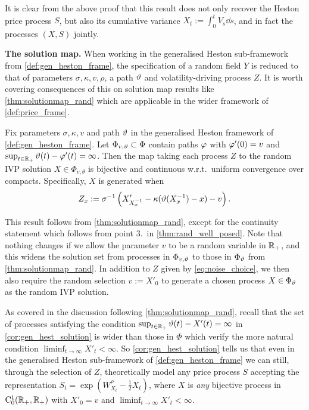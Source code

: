 It is clear from the above proof that this result does not only recover the Heston price process $S$, but also its cumulative variance $X_t:=\int_0^t V_s\dd s$, and in fact the processes $(X,S)$ jointly.

\vspace{3mm}\textbf{The solution map.} When working in the generalised Heston sub-framework from \autoref{def:gen_heston_frame}, the specification of a random field $Y$ is reduced to that of parameters $\sigma,\kappa,v,\rho$, a path $\vartheta$ and volatility-driving process $Z$. It is worth covering consequences of this on solution map results like \autoref{thm:solutionmap_rand} which are applicable in the wider framework of \autoref{def:price_frame}.

\begin{corollary}\label{cor:gen_hest_solution}
    Fix parameters $\sigma,\kappa,v$ and path $\vartheta$ in the generalised Heston framework of \autoref{def:gen_heston_frame}. Let $\Phi_{v,\vartheta}\subset\Phi$ contain paths $\varphi$ with $\varphi'(0)=v$ and $\sup_{t\in\mathbb{R}_+}\vartheta(t)-\varphi'(t)=\infty$. Then the map taking each process $Z$ to the random IVP solution $X\in\Phi_{v,\theta}$ is bijective and continuous w.r.t.~uniform convergence over compacts. Specifically, $X$ is generated when
    \begin{equation}\label{eq:noise_choice}
        Z_x := \sigma^{-1}\left( X'_{X^{-1}_x}-\kappa(\vartheta(X^{-1}_x) - x) - v \right).
    \end{equation}
\end{corollary}

This result follows from \autoref{thm:solutionmap_rand}, except for the continuity statement which follows from point 3.~in \autoref{thm:rand_well_posed}. Note that nothing changes if we allow the parameter $v$ to be a random variable in $\mathbb{R}_+$, and this widens the solution set from processes in $\Phi_{v,\vartheta}$ to those in $\Phi_{\vartheta}$ from \autoref{thm:solutionmap_rand}. In addition to $Z$ given by \autoref{eq:noise_choice}, we then also require the random selection $v:=X'_0$ to generate a chosen process $X\in\Phi_\vartheta$ as the random IVP solution.

As covered in the discussion following \autoref{thm:solutionmap_rand}, recall that the set of processes satisfying the condition $\sup_{t\in\mathbb{R}_+}\vartheta(t)-X'(t)=\infty$ in \autoref{cor:gen_hest_solution} is wider than those in $\Phi$ which verify the more natural condition $\liminf_{t\to\infty}X'_t<\infty$. So \autoref{cor:gen_hest_solution} tells us that even in the generalised Heston sub-framework of \autoref{def:gen_heston_frame} we can still, through the selection of $Z$, theoretically model any price process $S$ accepting the representation $S_t=\exp(W^\rho_{X_t}-\frac12 X_t)$, where $X$ is \emph{any} bijective process in $\mathrm{C}^1_0(\mathbb{R}_+,\mathbb{R}_+)$ with $X'_0=v$ and $\liminf_{t\to\infty}X'_t<\infty$.


